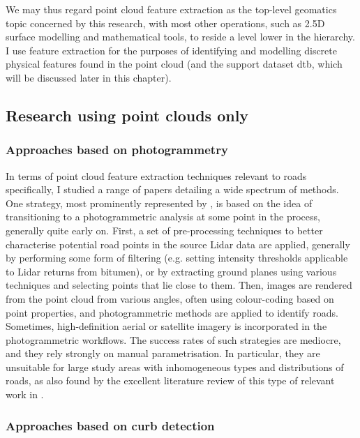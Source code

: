 We may thus regard point cloud feature extraction as the top-level geomatics topic concerned by this research, with most other operations, such as 2.5D surface modelling and mathematical tools, to reside a level lower in the hierarchy. I use feature extraction for the purposes of identifying and modelling discrete physical features found in the point cloud (and the support dataset \ac{dtb}, which will be discussed later in this chapter).

\subsection{Research using point clouds only}
\label{sub:roadidentification_pconly}

\subsubsection{Approaches based on photogrammetry}

In terms of point cloud feature extraction techniques relevant to roads specifically, I studied a range of papers detailing a wide spectrum of methods. One strategy, most prominently represented by \cite{hu_2003, hu_etal_2004, zhu_mordohai_2009, zhu_hyppa_2014, lin_etal_2015}, is based on the idea of transitioning to a photogrammetric analysis at some point in the process, generally quite early on. First, a set of pre-processing techniques to better characterise potential road points in the source Lidar data are applied, generally by performing some form of filtering (e.g. setting intensity thresholds applicable to Lidar returns from bitumen), or by extracting ground planes using various techniques and selecting points that lie close to them. Then, images are rendered from the point cloud from various angles, often using colour-coding based on point properties, and photogrammetric methods are applied to identify roads. Sometimes, high-definition aerial or satellite imagery is incorporated in the photogrammetric workflows. The success rates of such strategies are mediocre, and they rely strongly on manual parametrisation. In particular, they are unsuitable for large study areas with inhomogeneous types and distributions of roads, as also found by the excellent literature review of this type of relevant work in \cite{yang_etal_2013}.

\subsubsection{Approaches based on curb detection}

